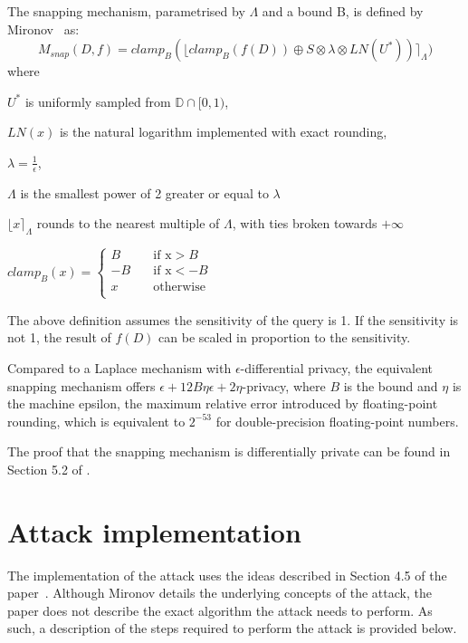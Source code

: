 \documentclass[orivec,envcountsame]{llncs}
\begin{document}
\begin{definition}
The snapping mechanism, parametrised by $\Lambda$ and a bound B, is defined by Mironov~\cite{mironov2012significance} as:
\large $$ M_{snap}(D, f) = clamp_B(\lfloor clamp_B(f(D)) \oplus S \otimes \lambda \otimes LN(U^*)) \rceil_\Lambda) $$
\normalsize where 

$U^*$ is uniformly sampled from $\mathbb{D} \cap [0, 1)$, 

$LN(x)$ is the natural logarithm implemented with exact rounding,

$\lambda = \frac{1}{\epsilon}$,

$\Lambda$ is the smallest power of 2 greater or equal to $\lambda$

$\lfloor x \rceil_\Lambda$ rounds to the nearest multiple of $\Lambda$, with ties broken towards $+\infty$ 

$clamp_B(x) =
\begin{cases}
    B &\quad\text{if x} > B \\
    -B &\quad\text{if x} < -B \\
    x &\quad\text{otherwise} \\ 
\end{cases} 
$
\end{definition}

The above definition assumes the sensitivity of the query is 1. If the sensitivity is not 1, the result of $f(D)$ can be scaled in proportion to the sensitivity. 

Compared to a Laplace mechanism with $\epsilon$-differential privacy, the equivalent snapping mechanism offers $\epsilon + 12B\eta\epsilon + 2\eta$-privacy, where $B$ is the bound and  $\eta$ is the machine epsilon, the maximum relative error introduced by floating-point rounding, which is equivalent to $2^{-53}$ for double-precision floating-point numbers.

The proof that the snapping mechanism is differentially private can be found in Section 5.2 of \cite{mironov2012significance}.


\section{Attack implementation}
The implementation of the attack uses the ideas described in Section 4.5 of the paper~\cite{mironov2012significance}. Although Mironov details the underlying concepts of the attack, the paper does not describe the exact algorithm the attack needs to perform. As such, a description of the steps required to perform the attack is provided below.
\end{document}

